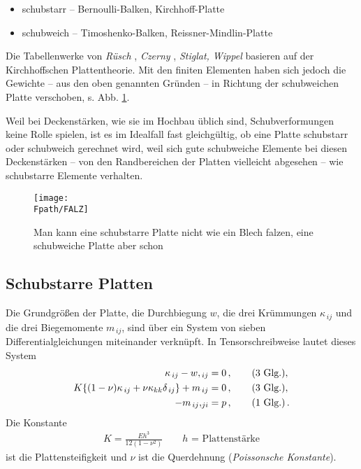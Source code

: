 \begin{itemize}
\item schubstarr -- Bernoulli-Balken, Kirchhoff-Platte
\item schubweich -- Timoshenko-Balken, Reissner-Mindlin-Platte
\end{itemize}
Die Tabellenwerke von {\em R\"{u}sch\/} \cite{Ruesch}, {\em Czerny\/} \cite{Czerny}, {\em Stiglat, Wippel} \cite{StiglatWippel} basieren auf der Kirchhoffschen Plattentheorie. Mit den finiten Elementen haben sich jedoch die Gewichte -- aus den oben genannten Gr\"{u}nden -- in Richtung der schubweichen Platte verschoben, s. Abb. \ref{Falz}.

Weil bei Deckenst\"{a}rken, wie sie im Hochbau \"{u}blich sind, Schubverformungen keine Rolle spielen, ist es im Idealfall fast gleichg\"{u}ltig, ob eine Platte schubstarr oder schubweich gerechnet wird, weil sich gute schubweiche Elemente bei diesen Deckenst\"{a}rken -- von den Randbereichen der Platten vielleicht abgesehen -- wie schubstarre Elemente verhalten.
\begin{figure}[tbp]
\centering
\if {} \sidecaption \fi
\texttt{[image: \\Fpath/FALZ]}
\caption{Man kann eine schubstarre Platte nicht wie ein Blech falzen, eine schubweiche Platte aber schon} \label{Falz}
\end{figure}%

\vspace{-0.5cm}

{\textcolor{sectionTitleBlue}{\section{Schubstarre Platten}}}\label{Schubstarre Platten}
Die Grundgr\"{o}{\ss}en der Platte, die Durchbiegung $w$, die drei Kr\"{u}mmungen $\kappa_{\,ij}$ und die drei Biegemomente $m_{\,ij}$, sind \"{u}ber ein System von sieben Differentialgleichungen miteinander verkn\"{u}pft. In Tensorschreibweise lautet dieses System
\begin{align} \label{SystemPlatte}
                      \kappa_{\,ij} - w,_{\,ij} &= 0\,, \qquad
\mbox{(3 Glg.)}, \nonumber \\
     K\{(1-\nu)\kappa_{\,ij} + \nu \kappa_{kk} \delta_{\,ij}\} +
m_{\,ij} &= 0\,, \qquad \mbox{(3 Glg.)},  \\
                         - m_{\,ij},_{ji} &= p\,, \qquad\mbox{(1 Glg.)}\,. \nonumber
\end{align}
Die Konstante
\begin{align}
K = \frac{E h^3}{12 (1 - \nu^2)} \qquad \mbox{$h$ = Plattenst\"{a}rke}
\end{align}
ist die Plattensteifigkeit und $\nu$ ist die Querdehnung ({\em Poissonsche
Konstante\/}).

